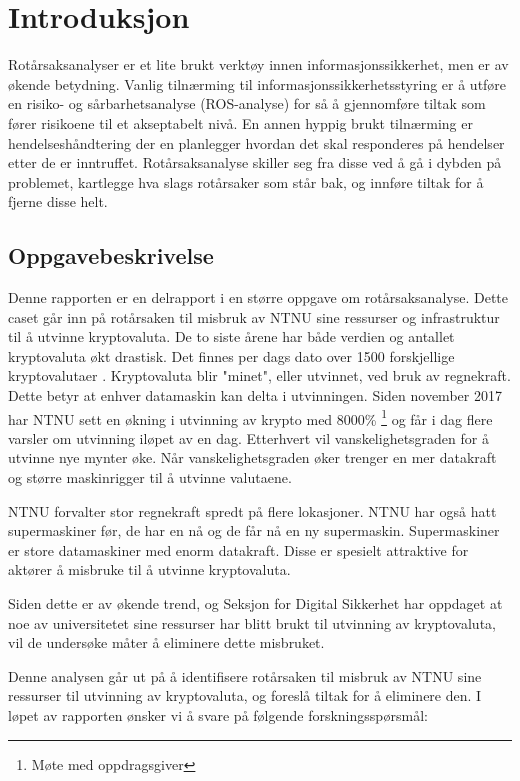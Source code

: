 \chapter{Introduksjon}
Rotårsaksanalyser er et lite brukt verktøy innen informasjonssikkerhet, men er av økende betydning. Vanlig tilnærming til informasjonssikkerhetsstyring er å utføre en risiko- og sårbarhetsanalyse (ROS-analyse) for så å gjennomføre tiltak som fører risikoene til et akseptabelt nivå. En annen hyppig brukt tilnærming er hendelseshåndtering der en planlegger hvordan det skal responderes på hendelser etter de er inntruffet. Rotårsaksanalyse skiller seg fra disse ved å gå i dybden på problemet, kartlegge hva slags rotårsaker som står bak, og innføre tiltak for å fjerne disse helt.

\section{Oppgavebeskrivelse}
Denne rapporten er en delrapport i en større oppgave om rotårsaksanalyse. Dette caset går inn på rotårsaken til misbruk av NTNU sine ressurser og infrastruktur til å utvinne kryptovaluta. De to siste årene har både verdien og antallet kryptovaluta økt drastisk. Det finnes per dags dato over 1500 forskjellige kryptovalutaer \cite{Cryptocurrency}. Kryptovaluta blir "minet", eller utvinnet, ved bruk av regnekraft. Dette betyr at enhver datamaskin kan delta i utvinningen. Siden november 2017 har NTNU sett en økning i utvinning av krypto med 8000\% \footnote{Møte med oppdragsgiver} og får i dag flere varsler om utvinning iløpet av en dag.  Etterhvert vil vanskelighetsgraden for å utvinne nye mynter øke. Når vanskelighetsgraden øker trenger en mer datakraft og større maskinrigger til å utvinne valutaene. 

NTNU forvalter stor regnekraft spredt på flere lokasjoner. NTNU har også hatt supermaskiner før, de har en nå og de får nå en ny supermaskin. Supermaskiner er store datamaskiner med enorm datakraft. Disse er spesielt attraktive for aktører å misbruke til å utvinne kryptovaluta. 

Siden dette er av økende trend, og Seksjon for Digital Sikkerhet har oppdaget at noe av universitetet sine ressurser har blitt brukt til utvinning av kryptovaluta, vil de undersøke måter å eliminere dette misbruket. 

Denne analysen går ut på å identifisere rotårsaken til misbruk av NTNU sine ressurser til utvinning av kryptovaluta, og foreslå tiltak for å eliminere den. I løpet av rapporten ønsker vi å svare på følgende forskningsspørsmål:

